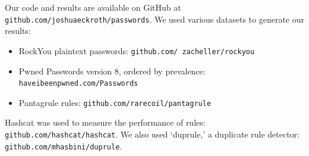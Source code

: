 \documentclass[letterpaper,twocolumn,10pt]{article}
\begin{document}
Our code and results are available on GitHub at
\texttt{github.com/joshuaeckroth/passwords}. We used various datasets
to generate our results:

\begin{itemize}
\item RockYou plaintext passwords:
\texttt{github.com/ zacheller/rockyou}
\item Pwned Passwords version 8, ordered by prevalence:
\texttt{haveibeenpwned.com/Passwords}
\item Pantagrule rules: \texttt{github.com/rarecoil/pantagrule}
\end{itemize}

Hashcat was used to measure the performance of rules:
\texttt{github.com/hashcat/hashcat}.
We also used
`duprule,' a duplicate rule detector:
\texttt{github.com/mhasbini/duprule}.





\end{document}
